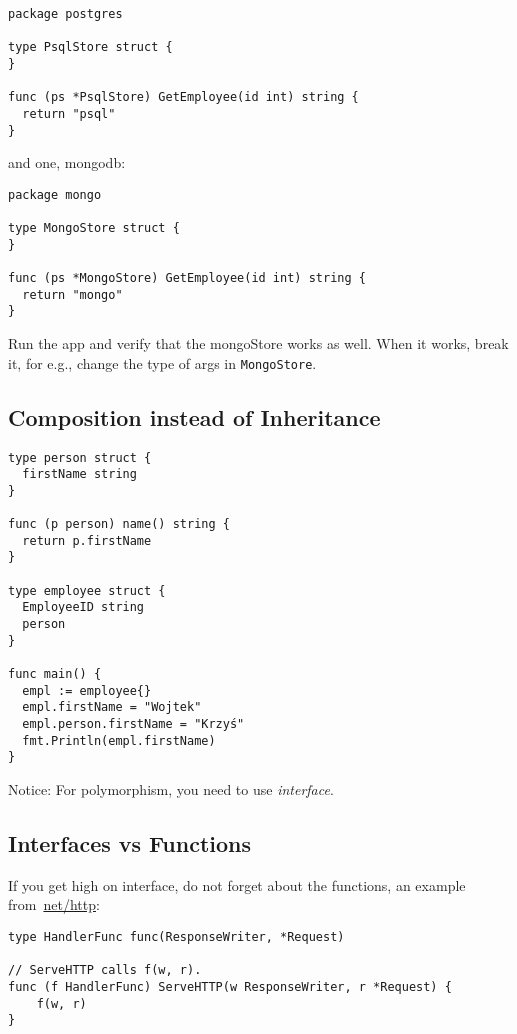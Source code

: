\documentclass[11pt, letterpaper]{article}
\begin{document}
\begin{verbatim}
package postgres

type PsqlStore struct {
}

func (ps *PsqlStore) GetEmployee(id int) string {
  return "psql"
}
\end{verbatim}

and one, mongodb:

\begin{verbatim}
package mongo

type MongoStore struct {
}

func (ps *MongoStore) GetEmployee(id int) string {
  return "mongo"
}
\end{verbatim}

Run the app and verify that the mongoStore works as well. When it works, break it, for e.g., change the type of args in \texttt{MongoStore}.

\subsection{Composition instead of Inheritance}

\begin{verbatim}
type person struct {
  firstName string
}

func (p person) name() string {
  return p.firstName
}

type employee struct {
  EmployeeID string
  person
}

func main() {
  empl := employee{}
  empl.firstName = "Wojtek"
  empl.person.firstName = "Krzyś"
  fmt.Println(empl.firstName)
}
\end{verbatim}

Notice: For polymorphism, you need to use \emph{interface}.

\subsection{Interfaces vs Functions}

If you get high on interface, do not forget about the functions, an example from~\href{https://golang.org/src/net/http/server.go}{net/http}:

\begin{verbatim}
type HandlerFunc func(ResponseWriter, *Request)

// ServeHTTP calls f(w, r).
func (f HandlerFunc) ServeHTTP(w ResponseWriter, r *Request) {
    f(w, r)
}
\end{verbatim}
\end{document}
